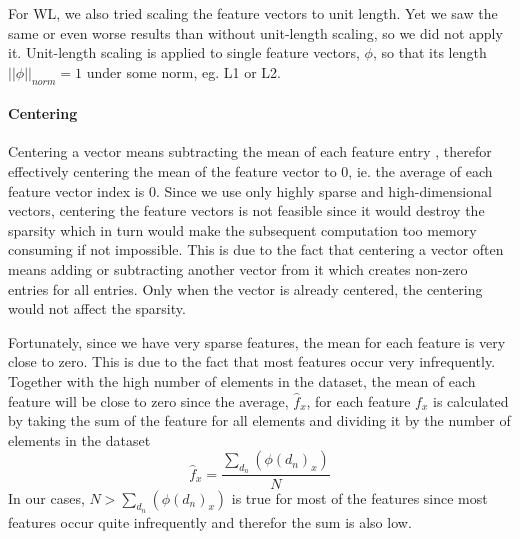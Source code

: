 For WL, we also tried scaling the feature vectors to unit length. Yet we saw the same or even worse results than without unit-length scaling, so we did not apply it.
Unit-length scaling is applied to single feature vectors, $\phi$, so that its length $||\phi||_{norm} = 1$ under some norm, eg. L1 or L2.

\paragraph{Centering}
Centering a vector means subtracting the mean of each feature entry  \cite[p.~567]{Bishop2006}, therefor effectively centering the mean of the feature vector to 0, ie. the average of each feature vector index is 0.
Since we use only highly sparse and high-dimensional vectors, centering the feature vectors is not feasible since it would destroy the sparsity which in turn would make the subsequent computation too memory consuming if not impossible.
This is due to the fact that centering a vector often means adding or subtracting another vector from it which creates non-zero entries for all entries.
Only when the vector is already centered, the centering would not affect the sparsity.


Fortunately, since we have very sparse features, the mean for each feature is very close to zero.
This is due to the fact that most features occur very infrequently. Together with the high number of elements in the dataset, the mean of each feature will be close to zero since the average, $\hat{f}_x$, for each feature $f_x$ is calculated by taking the sum of the feature for all elements and dividing it by the number of elements in the dataset
\begin{equation*}
\hat{f}_x = \frac{\sum_{d_n} (\phi(d_n)_x)}{N}
\end{equation*}
In our cases, $N > \sum_{d_n} (\phi(d_n)_x)$ is true for most of the features since most features occur quite infrequently and therefor the sum is also low.

